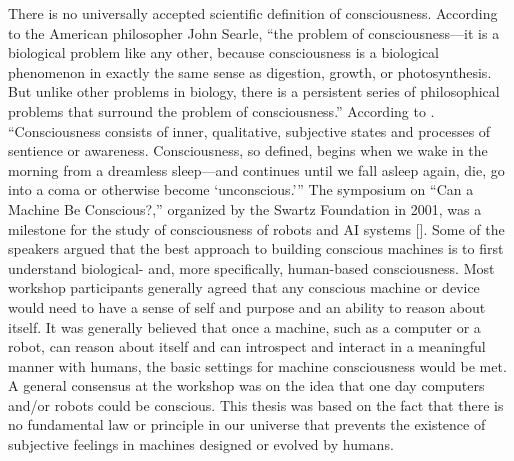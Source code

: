 There is no universally accepted scientific definition of consciousness. According to the American philosopher John Searle, ``the problem of consciousness---it is a biological problem like any other, because consciousness is a biological phenomenon in exactly the same sense as digestion, growth, or photosynthesis. But unlike other problems in biology, there is a persistent series of philosophical problems that surround the problem of consciousness.'' According to \citet{chap:11:Searle:2000}. ``Consciousness consists of inner, qualitative, subjective states and processes of sentience or awareness. Consciousness, so defined, begins when we wake in the morning from a dreamless sleep---and continues until we fall asleep again, die, go into a coma or otherwise become {\textquoteleft}unconscious.{\textquoteright}'' The symposium on ``Can a Machine Be Conscious?,'' organized by the Swartz Foundation in 2001, was a milestone for the study of consciousness of robots and AI systems [\citealt{chap:11:Koch:2001}]. Some of the speakers argued that the best approach to building conscious machines is to first understand biological- and, more specifically, human-based consciousness. Most workshop participants generally agreed that any conscious machine or device would need to have a sense of self and purpose and an ability to reason about itself. It was generally believed that once a machine, such as a computer or a robot, can reason about itself and can introspect and interact in a meaningful manner with humans, the basic settings for machine consciousness would be met. A general consensus at the workshop was on the idea that one day computers and/or robots could be conscious. This thesis was based on the fact that there is no fundamental law or principle in our universe that prevents the existence of subjective feelings in machines designed or evolved by humans.

